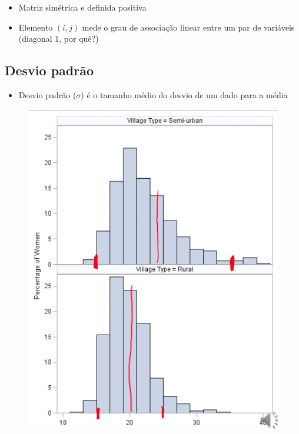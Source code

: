 \documentclass[
  letterpaper,
  DIV=11,
  numbers=noendperiod]{scrartcl}
\providecommand{\tightlist}{%
  \setlength{\itemsep}{0pt}\setlength{\parskip}{0pt}}\usepackage{longtable,booktabs,array}
\begin{document}
\begin{itemize}
\tightlist
\item
  Matriz simétrica e definida positiva
\item
  Elemento \((i,j)\) mede o grau de associação linear entre um par de
  variáveis (diagonal 1, por quê?)
\end{itemize}

\hypertarget{desvio-padruxe3o}{%
\subsection{Desvio padrão}\label{desvio-padruxe3o}}

\begin{itemize}
\tightlist
\item
  Desvio padrão (\(\sigma\)) é o tamanho médio do desvio de um dado para
  a média
\end{itemize}

\begin{figure}

{\centering \includegraphics{figs/Aula07/desviopadrao.png}

}

\end{figure}
\end{document}
